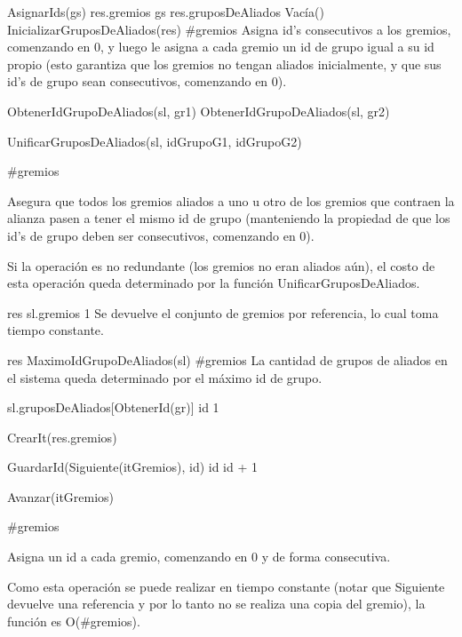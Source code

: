 {
	\state AsignarIds(gs)								
	\state res.gremios \asig gs 						
	\state
	\state res.gruposDeAliados \asig Vac\'ia()			
	\state InicializarGruposDeAliados(res)				
}
{\#gremios}
{Asigna id's consecutivos a los gremios, comenzando en 0, y luego le asigna a cada gremio un id de grupo igual a su id propio (esto garantiza que los gremios no tengan aliados inicialmente, y que sus id's de grupo sean consecutivos, comenzando en 0). }

{
	\state {} \asig ObtenerIdGrupoDeAliados(sl, gr1)			
	\state {} \asig ObtenerIdGrupoDeAliados(sl, gr2)			
	\state 

													
		\state UnificarGruposDeAliados(sl, idGrupoG1, idGrupoG2)					
	\endif
}
{\#gremios}
{ Asegura que todos los gremios aliados a uno u otro de los gremios que contraen la alianza pasen a tener el mismo id de grupo (manteniendo la propiedad de que los id's de grupo deben ser consecutivos, comenzando en 0).

\hspace{10pt} Si la operaci\'on es no redundante (los gremios no eran aliados a\'un), el costo de esta operaci\'on queda determinado por la funci\'on UnificarGruposDeAliados. }

{
	\state res \asig sl.gremios								
}
{1}
{ Se devuelve el conjunto de gremios por referencia, lo cual toma tiempo constante. }

{
	\state res \asig MaximoIdGrupoDeAliados(sl)			
}
{\#gremios}
{La cantidad de grupos de aliados en el sistema queda determinado por el m\'aximo id de grupo.}

{
	\state sl.gruposDeAliados[ObtenerId(gr)] \asig id			
}
{1}
{}

{
	\state {} 											
	\state

	\state {} \asig CrearIt(res.gremios)		
		\state
		
		\state GuardarId(Siguiente(itGremios), id)							
		\state id \asig id + 1												
		
		\state
		\state Avanzar(itGremios)											
	\endwhile
}
{ \#gremios }
{ Asigna un id a cada gremio, comenzando en 0 y de forma consecutiva.

\hspace{10pt} Como esta operaci\'on se puede realizar en tiempo constante (notar que Siguiente devuelve una referencia y por lo tanto no se realiza una copia del gremio), la funci\'on es O(\#gremios). }

